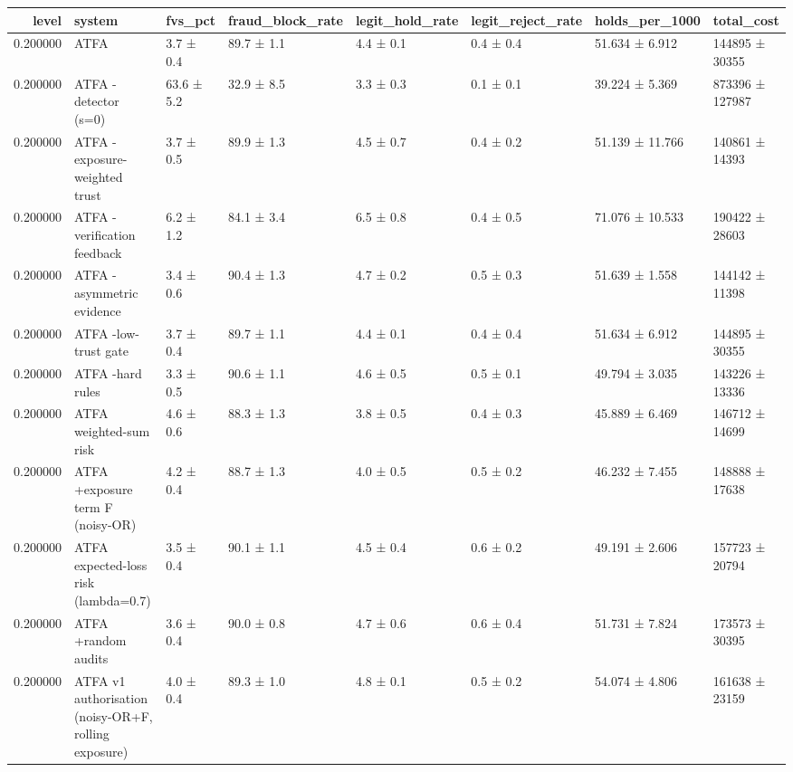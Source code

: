 \begin{tabular}{rlllllll}
\toprule
level & system & fvs\_pct & fraud\_block\_rate & legit\_hold\_rate & legit\_reject\_rate & holds\_per\_1000 & total\_cost \\
\midrule
0.200000 & ATFA & 3.7 ± 0.4 & 89.7 ± 1.1 & 4.4 ± 0.1 & 0.4 ± 0.4 & 51.634 ± 6.912 & 144895 ± 30355 \\
0.200000 & ATFA -detector (s=0) & 63.6 ± 5.2 & 32.9 ± 8.5 & 3.3 ± 0.3 & 0.1 ± 0.1 & 39.224 ± 5.369 & 873396 ± 127987 \\
0.200000 & ATFA -exposure-weighted trust & 3.7 ± 0.5 & 89.9 ± 1.3 & 4.5 ± 0.7 & 0.4 ± 0.2 & 51.139 ± 11.766 & 140861 ± 14393 \\
0.200000 & ATFA -verification feedback & 6.2 ± 1.2 & 84.1 ± 3.4 & 6.5 ± 0.8 & 0.4 ± 0.5 & 71.076 ± 10.533 & 190422 ± 28603 \\
0.200000 & ATFA -asymmetric evidence & 3.4 ± 0.6 & 90.4 ± 1.3 & 4.7 ± 0.2 & 0.5 ± 0.3 & 51.639 ± 1.558 & 144142 ± 11398 \\
0.200000 & ATFA -low-trust gate & 3.7 ± 0.4 & 89.7 ± 1.1 & 4.4 ± 0.1 & 0.4 ± 0.4 & 51.634 ± 6.912 & 144895 ± 30355 \\
0.200000 & ATFA -hard rules & 3.3 ± 0.5 & 90.6 ± 1.1 & 4.6 ± 0.5 & 0.5 ± 0.1 & 49.794 ± 3.035 & 143226 ± 13336 \\
0.200000 & ATFA weighted-sum risk & 4.6 ± 0.6 & 88.3 ± 1.3 & 3.8 ± 0.5 & 0.4 ± 0.3 & 45.889 ± 6.469 & 146712 ± 14699 \\
0.200000 & ATFA +exposure term F (noisy-OR) & 4.2 ± 0.4 & 88.7 ± 1.3 & 4.0 ± 0.5 & 0.5 ± 0.2 & 46.232 ± 7.455 & 148888 ± 17638 \\
0.200000 & ATFA expected-loss risk (lambda=0.7) & 3.5 ± 0.4 & 90.1 ± 1.1 & 4.5 ± 0.4 & 0.6 ± 0.2 & 49.191 ± 2.606 & 157723 ± 20794 \\
0.200000 & ATFA +random audits & 3.6 ± 0.4 & 90.0 ± 0.8 & 4.7 ± 0.6 & 0.6 ± 0.4 & 51.731 ± 7.824 & 173573 ± 30395 \\
0.200000 & ATFA v1 authorisation (noisy-OR+F, rolling exposure) & 4.0 ± 0.4 & 89.3 ± 1.0 & 4.8 ± 0.1 & 0.5 ± 0.2 & 54.074 ± 4.806 & 161638 ± 23159 \\
\bottomrule
\end{tabular}
